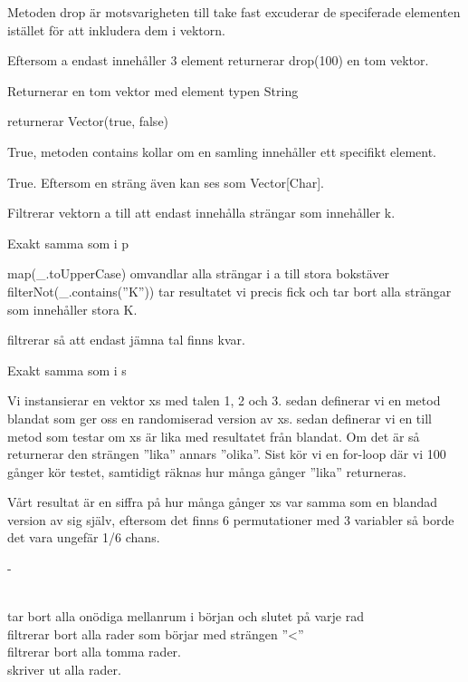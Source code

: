 \Subtask
Metoden drop är motsvarigheten till take fast excuderar de speciferade elementen istället för att inkludera dem i vektorn.

\Subtask
Eftersom a endast innehåller 3 element returnerar drop(100) en tom vektor.

\Subtask
Returnerar en tom vektor med element typen String

\Subtask
returnerar Vector(true, false)

\Subtask
True, metoden contains kollar om en samling innehåller ett specifikt element.

\Subtask
True. Eftersom en sträng även kan ses som Vector[Char].

\Subtask
Filtrerar vektorn a till att endast innehålla strängar som innehåller k.

\Subtask
Exakt samma som i p

\Subtask
map(\_.toUpperCase) omvandlar alla strängar i a till stora bokstäver
filterNot(\_.contains(''K'')) tar resultatet vi precis fick och tar bort alla strängar som innehåller stora K.

\Subtask
filtrerar så att endast jämna tal finns kvar.

\Subtask
Exakt samma som i s



\Task %

\Subtask
Vi instansierar en vektor xs med talen 1, 2 och 3.
sedan definerar vi en metod blandat som ger oss en randomiserad version av xs.
sedan definerar vi en till metod som testar om xs är lika med resultatet från blandat. Om det är så returnerar den strängen ''lika'' annars ''olika''.
Sist kör vi en for-loop där vi 100 gånger kör testet, samtidigt räknas hur många gånger ''lika'' returneras.

Vårt resultat är en siffra på hur många gånger xs var samma som en blandad version av sig själv, eftersom det finns 6 permutationer med 3 variabler så borde det vara ungefär 1/6 chans.

\Subtask -

\Subtask
\\  tar bort alla onödiga mellanrum i början och slutet på varje rad
\\  filtrerar bort alla rader som börjar med strängen ''<''
\\  filtrerar bort alla tomma rader.
\\  skriver ut alla rader.

